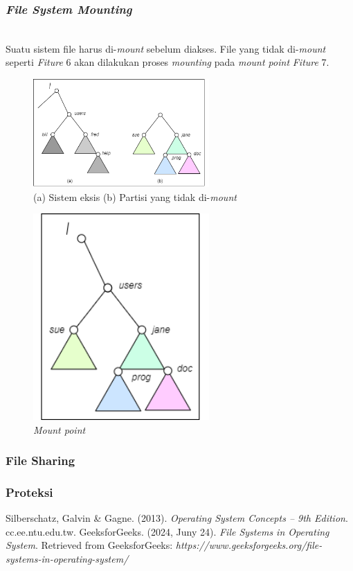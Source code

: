 \documentclass[12pt]{article}
\begin{document}
    \subsubsection{\textit{File System Mounting}}
    \\Suatu sistem file harus di-\textit{mount} sebelum diakses. File yang tidak di-\textit{mount} seperti \textit{Fiture} 6 akan dilakukan proses \textit{mounting} pada \textit{mount point} \textit{Fiture} 7.
        \begin{figure}[h!]
			\centering
			\includegraphics[width=0.6\textwidth]{asset/gambar6.png}
            \caption{(a) Sistem eksis (b) Partisi yang tidak di-\textit{mount}}
        \end{figure}
        \begin{figure}[h!]
			\centering
			\includegraphics[width=0.6\textwidth]{asset/gambar7.png}
            \caption{\textit{Mount point}}
        \end{figure}
    \subsubsection{File Sharing}
    \subsubsection{Proteksi}
    \begin{thebibliography}{99}
        Silberschatz, Galvin \& Gagne. (2013). \textit{Operating System Concepts – 9th Edition}. cc.ee.ntu.edu.tw.
        GeeksforGeeks. (2024, Juny 24). \textit{File Systems in Operating System}. Retrieved from GeeksforGeeks: \textit{https://www.geeksforgeeks.org/file-systems-in-operating-system/}
    \end{thebibliography}
\end{document}
